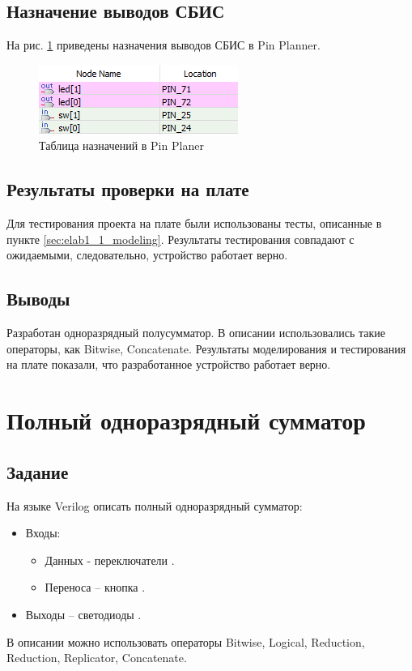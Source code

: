 \subsection{Назначение выводов СБИС}

На рис. \ref{fig:elab1_1_pins} приведены назначения выводов СБИС в Pin Planner.

\begin{figure}[H]
\begin{center}
	\includegraphics{elab1_1_pins}
	\caption{Таблица назначений в Pin Planer}
	\label{fig:elab1_1_pins}
\end{center}
\end{figure}

\subsection{Результаты проверки на плате}

Для тестирования проекта на плате были использованы тесты, описанные в пункте \ref{sec:elab1_1_modeling}. Результаты тестирования совпадают с ожидаемыми, следовательно, устройство работает верно.

\subsection{Выводы}

Разработан одноразрядный полусумматор. В описании использовались такие операторы, как Bitwise, Concatenate. Результаты моделирования и тестирования на плате показали, что разработанное устройство работает верно.

\newpage

\section{Полный одноразрядный сумматор}

\subsection{Задание}

На языке Verilog описать полный одноразрядный сумматор:
\begin{itemize}
	\item Входы:
	\begin{itemize}
		\item Данных - переключатели .
		\item Переноса – кнопка .
	\end{itemize}
	\item Выходы – светодиоды .
\end{itemize}
В описании можно использовать операторы Bitwise, Logical, Reduction, Reduction, Replicator, Concatenate.

